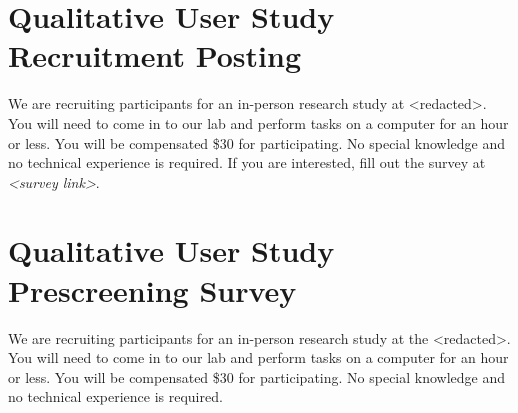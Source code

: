 \documentclass[USenglish,oneside,twocolumn]{article}
\begin{document}
\section{Qualitative User Study Recruitment Posting} 
\label{qualitative-recruitment}
We are recruiting participants for an in-person research study at <redacted>. %
You will need to come in to our lab and perform tasks on a computer for an hour or less. You will be compensated \$30 for participating. 
No special knowledge and no technical experience is required. If you are interested, fill out the survey at \textit{<survey link>}. 

\section{Qualitative User Study Prescreening Survey} 
\label{qualitative-prescreening}
We are recruiting participants for an in-person research study at the <redacted>. %
You will need to come in to our lab and perform tasks on a computer for an hour or less. You will be compensated \$30 for participating. No special knowledge and no technical experience is required.\\
\end{document}
